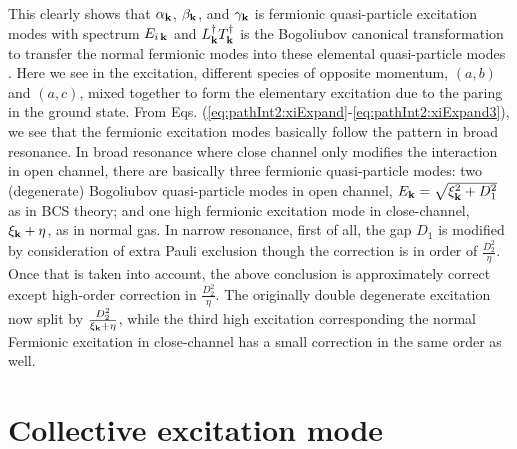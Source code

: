 This clearly shows that $\alpha_{\mathbf{k}}$, $\beta_{\mathbf{k}}$, and $\gamma_{\mathbf{k}}$ is fermionic quasi-particle excitation modes with spectrum $E_{i\,\mathbf{k}}$ and   $L^{\dagger}_{\mathbf{k}}T^{\dagger}_{\mathbf{k}}$ is  the Bogoliubov canonical transformation to transfer the normal fermionic modes into these elemental quasi-particle modes .  Here we see in the excitation, different species of opposite momentum, $(a,b)$ and $(a,c)$, mixed together to form the elementary excitation due to the paring in the ground state.  
  From Eqs. (\ref{eq:pathInt2:xiExpand}-\ref{eq:pathInt2:xiExpand3}), we see that the fermionic excitation modes basically follow the pattern in broad resonance.  In broad resonance where close channel only modifies the interaction in open channel,  there are basically three fermionic quasi-particle modes: two (degenerate) Bogoliubov quasi-particle modes  in open channel, $E_{\mathbf{k}}=\sqrt{\xi^{2}_{\mathbf{k}}+D_{1}^{2}}$ as in BCS theory; and one high fermionic excitation mode in close-channel, $\xi_{\mathbf{k}}+\eta$, as in normal gas.  In narrow resonance, first of all, the gap $D_{1}$ is modified  by consideration of extra Pauli exclusion though the correction is in order of $\frac{D_2^2}{\eta}$.  Once that is taken into account, the above conclusion is approximately correct except high-order correction in $\frac{D_{2}^{2}}{\eta}$.   The originally double degenerate excitation now split by $\frac{D_{2}^{2}}{\xi_{\mathbf{k}}+\eta}$, while the third high excitation corresponding the normal Fermionic excitation in close-channel has a small correction in the same order as well. 

\section{Collective excitation mode}
%

